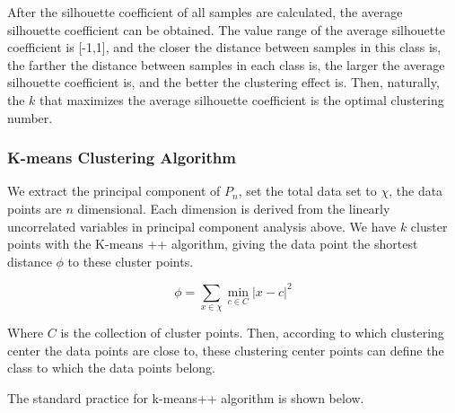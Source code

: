 \documentclass[
  journal=medium,
  manuscript=Report,
  year=2023,
  volume=37,
]{cup-journal}
\begin{document}
After the silhouette coefficient of all samples are calculated, the average silhouette coefficient can be obtained. The value range of the average silhouette coefficient is [-1,1], and the closer the distance between samples in this class is, the farther the distance between samples in each class is, the larger the average silhouette coefficient is, and the better the clustering effect is. Then, naturally, the $k$ that maximizes the average silhouette coefficient is the optimal clustering number.

\subsubsection{K-means Clustering Algorithm}

We extract the principal component of $P_n$, set the total data set to $\chi$, the data points are $n$ dimensional. Each dimension is derived from the linearly uncorrelated variables in principal component analysis above. We have $k$ cluster points with the K-means ++ algorithm, giving the data point the shortest distance $\phi$ to these cluster points.

$$\phi = \sum_{x\in\chi}\min_{c\in C}|x-c|^2$$

Where $C$ is the collection of cluster points. Then, according to which clustering center the data points are close to, these clustering center points can define the class to which the data points belong.

The standard practice for k-means++ algorithm is shown below.
\end{document}
